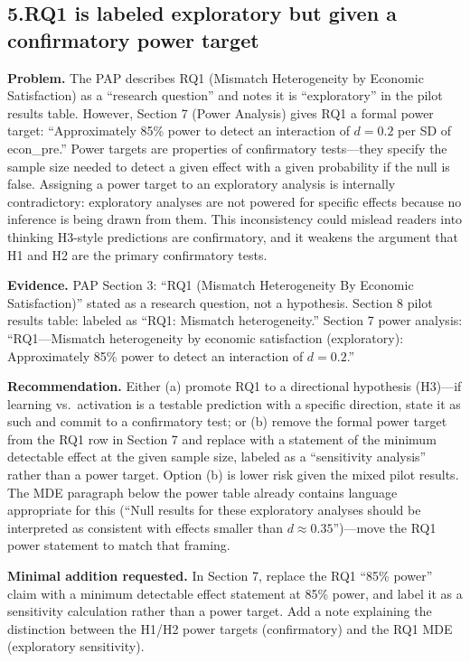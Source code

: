 \documentclass[11pt]{article}
\begin{document}
\bigskip

\subsection*{5.\enspace RQ1 is labeled exploratory but given a confirmatory power target}

\textbf{Problem.} The PAP describes RQ1 (Mismatch Heterogeneity by Economic Satisfaction) as a ``research question'' and notes it is ``exploratory'' in the pilot results table. However, Section 7 (Power Analysis) gives RQ1 a formal power target: ``Approximately 85\% power to detect an interaction of $d = 0.2$ per SD of econ\_pre.'' Power targets are properties of confirmatory tests---they specify the sample size needed to detect a given effect with a given probability if the null is false. Assigning a power target to an exploratory analysis is internally contradictory: exploratory analyses are not powered for specific effects because no inference is being drawn from them. This inconsistency could mislead readers into thinking H3-style predictions are confirmatory, and it weakens the argument that H1 and H2 are the primary confirmatory tests.

\textbf{Evidence.} PAP Section 3: ``RQ1 (Mismatch Heterogeneity By Economic Satisfaction)'' stated as a research question, not a hypothesis. Section 8 pilot results table: labeled as ``RQ1: Mismatch heterogeneity.'' Section 7 power analysis: ``RQ1---Mismatch heterogeneity by economic satisfaction (exploratory): Approximately 85\% power to detect an interaction of $d = 0.2$.''

\textbf{Recommendation.} Either (a) promote RQ1 to a directional hypothesis (H3)---if learning vs.\ activation is a testable prediction with a specific direction, state it as such and commit to a confirmatory test; or (b) remove the formal power target from the RQ1 row in Section 7 and replace with a statement of the minimum detectable effect at the given sample size, labeled as a ``sensitivity analysis'' rather than a power target. Option (b) is lower risk given the mixed pilot results. The MDE paragraph below the power table already contains language appropriate for this (``Null results for these exploratory analyses should be interpreted as consistent with effects smaller than $d \approx 0.35$'')---move the RQ1 power statement to match that framing.

\textbf{Minimal addition requested.} In Section 7, replace the RQ1 ``85\% power'' claim with a minimum detectable effect statement at 85\% power, and label it as a sensitivity calculation rather than a power target. Add a note explaining the distinction between the H1/H2 power targets (confirmatory) and the RQ1 MDE (exploratory sensitivity).
\end{document}
